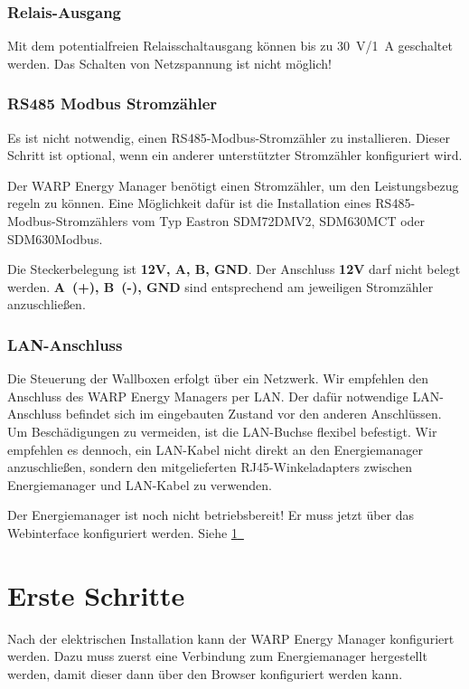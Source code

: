 \documentclass[a4paper,10pt]{article}
\newcommand{\hint}[1]{\begin{tcolorbox}[colback=boxgray,colframe=black,coltext=
white,title=Hinweis,left*=2mm,right*=2mm,boxsep=1mm,bottom=1mm,top=1mm]#1\end{tcolorbox}}
\newcommand*{\fullref}[1]{\hyperref[{#1}]{\ref*{#1}~\nameref*{#1}}}
\begin{document}
\begin{multicols*}{2}
	\subsubsection{Relais-Ausgang}
	Mit dem potentialfreien Relaisschaltausgang können bis zu \SI{30}{\volt}/\SI{1}{\ampere} geschaltet
	werden. Das Schalten von Netzspannung ist nicht möglich!

	\subsubsection{RS485 Modbus Stromzähler}
	\hint{Es ist nicht notwendig, einen RS485-Modbus-Stromzähler zu installieren. Dieser
	Schritt ist optional, wenn ein anderer unterstützter Stromzähler konfiguriert
	wird.}

	Der WARP Energy Manager benötigt einen Stromzähler, um den Leistungsbezug regeln zu
	können. Eine Möglichkeit dafür ist die Installation eines RS485-Modbus-Stromzählers vom Typ Eastron SDM72DMV2, SDM630MCT oder SDM630Modbus.

	Die Steckerbelegung ist \textbf{12V, A, B, GND}. Der Anschluss \textbf{12V}
	darf nicht belegt werden. \textbf{A~(+), B~(-), GND} sind entsprechend
	am jeweiligen Stromzähler anzuschließen.

	\subsubsection{LAN-Anschluss}
	Die Steuerung der Wallboxen erfolgt über ein Netzwerk. Wir empfehlen den
	Anschluss des WARP Energy Managers per LAN. Der dafür notwendige LAN-Anschluss
	befindet sich im eingebauten Zustand vor den anderen Anschlüssen. Um Beschädigungen
	zu vermeiden, ist die LAN-Buchse flexibel befestigt. Wir empfehlen es dennoch, ein LAN-Kabel
	nicht direkt an den Energiemanager anzuschließen, sondern den mitgelieferten RJ45-Winkeladapters zwischen Energiemanager und LAN-Kabel zu verwenden.

	\hint{Der Energiemanager ist noch nicht betriebsbereit! Er muss jetzt über das Webinterface konfiguriert werden. Siehe \fullref{setup}}

	\vfill
	\null
	\newpage
	\section{Erste Schritte}
	\label{setup}

	Nach der elektrischen Installation kann der WARP Energy Manager konfiguriert
	werden. Dazu muss zuerst eine Verbindung zum Energiemanager hergestellt werden,
	damit dieser dann über den Browser konfiguriert werden kann.


\end{multicols*}
\end{document}
